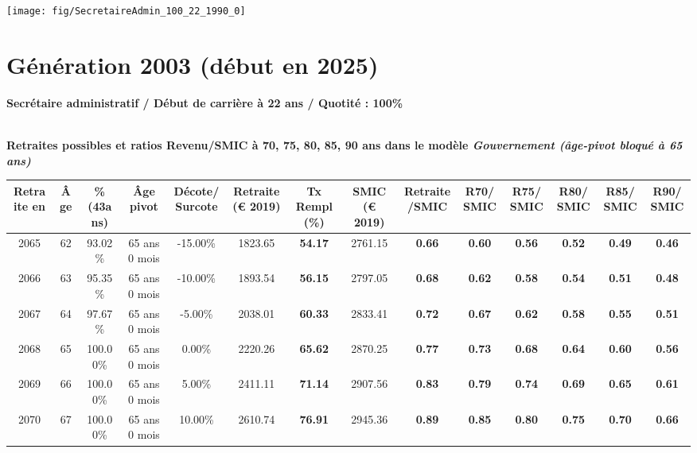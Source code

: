  {\hspace{-2.2cm}\texttt{[image: fig/SecretaireAdmin\_100\_22\_1990\_0]}} 

\newpage 
 
\section{Génération 2003 (début en 2025)\label{SecretaireAdmin_100_22_2003_0}} 
 
{\bf \noindent Secrétaire administratif / Début de carrière à 22 ans / Quotité : 100\%}  ~ 

 ~\\{\bf \noindent Retraites possibles et ratios Revenu/SMIC à 70, 75, 80, 85, 90 ans dans le modèle \emph{Gouvernement (âge-pivot bloqué à 65 ans)}}  
 
\begin{adjustbox}{max width=\textwidth} 
\begin{tabular}[htb]{|c|c||c|c|c||c|c||c|c||c|c|c|c|c|} 
\hline 
 Retraite en &  Âge &  \%(43ans) &  Âge pivot &  Décote/Surcote &  Retraite (\euro{} 2019) &  Tx Rempl(\%) &  SMIC (\euro{} 2019) &  Retraite/SMIC &  R70/SMIC &  R75/SMIC &  R80/SMIC &  R85/SMIC &  R90/SMIC \\ 
\hline \hline 
 2065 &  62 &  93.02\% &  65 ans 0 mois &  -15.00\% &  1823.65 &  {\bf 54.17} &  2761.15 &  {\bf {\color{red} 0.66}} &  {\bf {\color{red} 0.60}} &  {\bf {\color{red} 0.56}} &  {\bf {\color{red} 0.52}} &  {\bf {\color{red} 0.49}} &  {\bf {\color{red} 0.46}} \\ 
\hline 
 2066 &  63 &  95.35\% &  65 ans 0 mois &  -10.00\% &  1893.54 &  {\bf 56.15} &  2797.05 &  {\bf {\color{red} 0.68}} &  {\bf {\color{red} 0.62}} &  {\bf {\color{red} 0.58}} &  {\bf {\color{red} 0.54}} &  {\bf {\color{red} 0.51}} &  {\bf {\color{red} 0.48}} \\ 
\hline 
 2067 &  64 &  97.67\% &  65 ans 0 mois &  -5.00\% &  2038.01 &  {\bf 60.33} &  2833.41 &  {\bf {\color{red} 0.72}} &  {\bf {\color{red} 0.67}} &  {\bf {\color{red} 0.62}} &  {\bf {\color{red} 0.58}} &  {\bf {\color{red} 0.55}} &  {\bf {\color{red} 0.51}} \\ 
\hline 
 2068 &  65 &  100.00\% &  65 ans 0 mois &  0.00\% &  2220.26 &  {\bf 65.62} &  2870.25 &  {\bf {\color{red} 0.77}} &  {\bf {\color{red} 0.73}} &  {\bf {\color{red} 0.68}} &  {\bf {\color{red} 0.64}} &  {\bf {\color{red} 0.60}} &  {\bf {\color{red} 0.56}} \\ 
\hline 
 2069 &  66 &  100.00\% &  65 ans 0 mois &  5.00\% &  2411.11 &  {\bf 71.14} &  2907.56 &  {\bf {\color{red} 0.83}} &  {\bf {\color{red} 0.79}} &  {\bf {\color{red} 0.74}} &  {\bf {\color{red} 0.69}} &  {\bf {\color{red} 0.65}} &  {\bf {\color{red} 0.61}} \\ 
\hline 
 2070 &  67 &  100.00\% &  65 ans 0 mois &  10.00\% &  2610.74 &  {\bf 76.91} &  2945.36 &  {\bf {\color{red} 0.89}} &  {\bf {\color{red} 0.85}} &  {\bf {\color{red} 0.80}} &  {\bf {\color{red} 0.75}} &  {\bf {\color{red} 0.70}} &  {\bf {\color{red} 0.66}} \\ 
\hline 
\hline 
\end{tabular} 
\end{adjustbox} 
 

